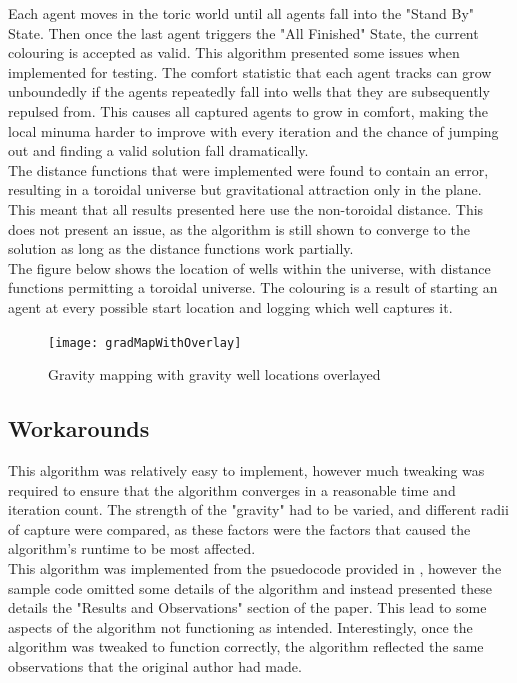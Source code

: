 Each agent moves in the toric world until all agents fall into the "Stand By" State. Then once the last agent triggers the "All Finished" State, the current colouring is accepted as valid. This algorithm presented some issues when implemented for testing. The comfort statistic that each agent tracks can grow unboundedly if the agents repeatedly fall into wells that they are subsequently repulsed from. This causes all captured agents to grow in comfort, making the local minuma harder to improve with every iteration and the chance of jumping out and finding a valid solution fall dramatically. 
\\The distance functions that were implemented were found to contain an error, resulting in a toroidal universe but gravitational attraction only in the plane. This meant that all results presented here use the non-toroidal distance. This does not present an issue, as the algorithm is still shown to converge to the solution as long as the distance functions work partially.
\\The figure below shows the location of wells within the universe, with distance functions permitting a toroidal universe. The colouring is a result of starting an agent at every possible start location and logging which well captures it. 
\begin{figure}[H]
\caption{Gravity mapping with gravity well locations overlayed}
\centering
\texttt{[image: gradMapWithOverlay]}
\end{figure}

\subsection{Workarounds}
This algorithm was relatively easy to implement, however much tweaking was required to ensure that the algorithm converges in a reasonable time and iteration count. The strength of the "gravity" had to be varied, and different radii of capture were compared, as these factors were the factors that caused the algorithm's runtime to be most affected. 
\\This algorithm was implemented from the psuedocode provided in \cite{bib:GravSwarm}, however the sample code omitted some details of the algorithm and instead presented these details the "Results and Observations" section of the paper. This lead to some aspects of the algorithm not functioning as intended. Interestingly, once the algorithm was tweaked to function correctly, the algorithm reflected the same observations that the original author had made. 

